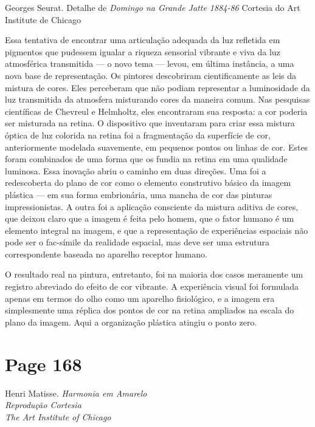 \documentclass[a4paper]{article}
\begin{document}
\vspace{5em} %

Georges Seurat.
Detalhe de
\emph{Domingo na Grande Jatte 1884-86}
Cortesia do Art Institute de Chicago

\par
Essa tentativa de encontrar uma articulação adequada da luz refletida em pigmentos que pudessem igualar a riqueza sensorial vibrante e viva da luz atmosférica transmitida — o novo tema — levou, em última instância, a uma nova base de representação. Os pintores descobriram cientificamente as leis da mistura de cores. Eles perceberam que não podiam representar a luminosidade da luz transmitida da atmosfera misturando cores da maneira comum. Nas pesquisas científicas de Chevreul e Helmholtz, eles encontraram sua resposta: a cor poderia ser misturada na retina. O dispositivo que inventaram para criar essa mistura óptica de luz colorida na retina foi a fragmentação da superfície de cor, anteriormente modelada suavemente, em pequenos pontos ou linhas de cor. Estes foram combinados de uma forma que os fundia na retina em uma qualidade luminosa. Essa inovação abriu o caminho em duas direções. Uma foi a redescoberta do plano de cor como o elemento construtivo básico da imagem plástica — em sua forma embrionária, uma mancha de cor das pinturas impressionistas. A outra foi a aplicação consciente da mistura aditiva de cores, que deixou claro que a imagem é feita pelo homem, que o fator humano é um elemento integral na imagem, e que a representação de experiências espaciais não pode ser o fac-símile da realidade espacial, mas deve ser uma estrutura correspondente baseada no aparelho receptor humano.

\par
O resultado real na pintura, entretanto, foi na maioria dos casos meramente um registro abreviado do efeito de cor vibrante. A experiência visual foi formulada apenas em termos do olho como um aparelho fisiológico, e a imagem era simplesmente uma réplica dos pontos de cor na retina ampliados na escala do plano da imagem. Aqui a organização plástica atingiu o ponto zero.

\par
{}

\newpage
\section*{Page 168}

\noindent Henri Matisse. \textit{Harmonia em Amarelo} \\
\noindent \textit{Reprodução Cortesia} \\
\noindent \textit{The Art Institute of Chicago}
\end{document}
